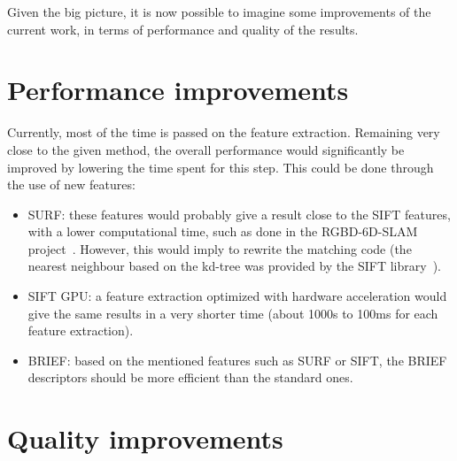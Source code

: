 Given the big picture, it is now possible to imagine some improvements of the current work, in terms of performance and quality of the results.

\section{Performance improvements}

Currently, most of the time is passed on the feature extraction. Remaining very close to the given method, the overall performance would significantly be improved by lowering the time spent for this step. This could be done through the use of new features:
\begin{itemize}
\item SURF: these features would probably give a result close to the SIFT features, with a lower computational time, such as done in the RGBD-6D-SLAM project~\cite{engelhard11euron-workshop}. However, this would imply to rewrite the matching code (the nearest neighbour based on the kd-tree was provided by the SIFT library~\cite{hess_sift}).
\item SIFT GPU: a feature extraction optimized with hardware acceleration would give the same results in a very shorter time (about 1000s to 100ms for each feature extraction).
\item BRIEF: based on the mentioned features such as SURF or SIFT, the BRIEF descriptors\cite{Calonder10-brief} should be more efficient than the standard ones.
\end{itemize}

\section{Quality improvements}

